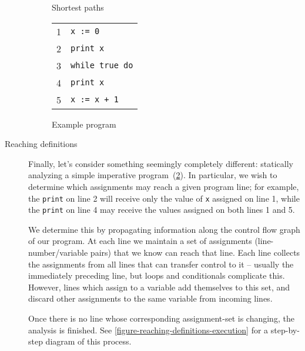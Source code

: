 \begin{description}
\begin{figure}[pth]
  \centering
  \XXX
  \caption{Shortest paths}
  \label{figure-shortest-paths}
\end{figure}


\begin{figure}[pth]
  \centering
  \ttfamily
  \begin{tabular}{cl}
    1 & \tt x := 0\\
    2 & \tt print x\\
    3 & \tt while true do\\
    4 & \tt\quad print x\\
    5 & \tt\quad x := x + 1
  \end{tabular}
  \caption{Example program}
  \label{figure-reaching-definitions}
\end{figure}

\item[Reaching definitions]
%
Finally, let's consider something seemingly completely different: statically
analyzing a simple imperative program~(\cref{figure-reaching-definitions}).
%
%
In particular, we wish to determine which assignments may reach a given program
line; for example, the \texttt{print} on line 2 will receive only the value of
\texttt{x} assigned on line 1, while the \texttt{print} on line 4 may receive
the values assigned on both lines 1 and 5.

We determine this by propagating information along the control flow graph of our
program.
%
At each line we maintain a set of assignments (line-number/variable pairs) that
we know can reach that line.
%
Each line collects the assignments from all lines that can transfer control to
it -- usually the immediately preceding line, but loops and conditionals
complicate this.
%
However, lines which assign to a variable add themselves to this set, and discard other assignments to the same variable from incoming lines.

Once there is no line whose corresponding assignment-set is changing, the analysis is finished.
%
See \cref{figure-reaching-definitions-execution} for a step-by-step diagram of this process. 



\end{description}

